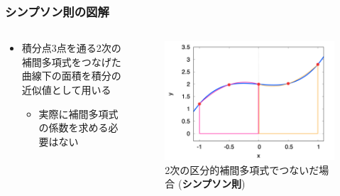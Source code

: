 \documentclass[dvipdfmx,aspectratio=169,20pt]{beamer}
\newcommand{\myfontsetting}[3]{{\fontsize{#1}{#2}\selectfont #3}}
\begin{document}
\begin{frame}
\frametitle{\myfontsetting{28pt}{28pt}{シンプソン則の図解}}
\begin{columns}[t]
\begin{column}{0.55\textwidth} 
\vspace{-5mm}
\begin{itemize}
    \setlength{\itemsep}{0.25cm}
    \item \myfontsetting{15pt}{17pt}{積分点3点を通る2次の補間多項式をつなげた曲線下の面積を積分の近似値として用いる}
    \begin{itemize}
        \item \myfontsetting{12pt}{12pt}{実際に補間多項式の係数を求める必要はない}
    \end{itemize}
\end{itemize}
\end{column}
\begin{column}{0.45\textwidth} 
\begin{figure}[h]
	\begin{center}
\vspace{-12mm}
    \includegraphics[width=1.0\textwidth]{fig11-2_simpson_rule_N4.png}
	\end{center}
	\vspace{-5mm}
	\caption{\myfontsetting{10pt}{10pt}{2次の区分的補間多項式でつないだ場合 ({\bf シンプソン則})}}
\end{figure}
\end{column}
\end{columns}
\end{frame}
\end{document}
